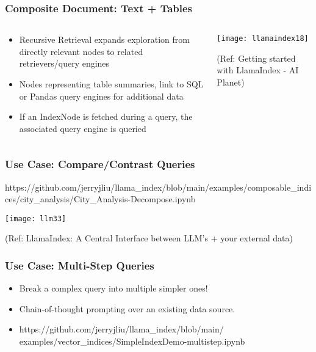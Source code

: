 \begin{frame}[fragile]\frametitle{Composite Document: Text + Tables}


\begin{columns}
    \begin{column}[T]{0.4\linewidth}

		\begin{itemize}
		\item Recursive Retrieval expands exploration from directly relevant nodes to related retrievers/query engines
		\item Nodes representing table summaries, link to SQL or Pandas query engines for additional data
		\item If an IndexNode is fetched during a query, the associated query engine is queried
		\end{itemize}	
		
    \end{column}
    \begin{column}[T]{0.6\linewidth}
		\begin{center}
		\texttt{[image: llamaindex18]}

		{\tiny (Ref: Getting started with LlamaIndex - AI Planet)}
		\end{center}
    \end{column}
  \end{columns}
  


\end{frame}

\begin{frame}[fragile]\frametitle{Use Case: Compare/Contrast Queries}

https://github.com/jerryjliu/llama\_index/blob/main/examples/composable\_indices/city\_analysis/City\_Analysis-Decompose.ipynb

\begin{center}
\texttt{[image: llm33]}

{\tiny (Ref: LlamaIndex: A Central Interface between LLM’s + your external data)}
\end{center}
\end{frame}

\begin{frame}[fragile]\frametitle{Use Case: Multi-Step Queries}

\begin{itemize}
\item Break a complex query into multiple simpler ones! 
\item Chain-of-thought prompting over an existing data source.
\item https://github.com/jerryjliu/llama\_index/blob/main/
examples/vector\_indices/SimpleIndexDemo-multistep.ipynb
\end{itemize}	

\end{frame}


